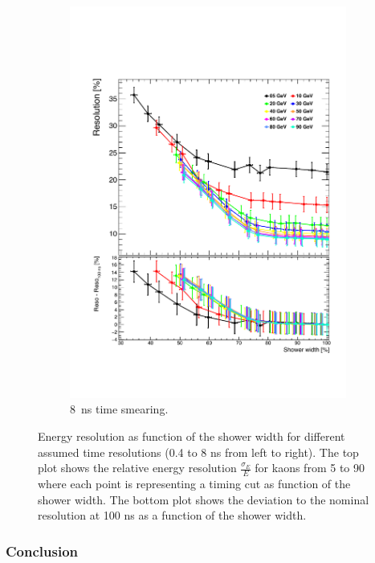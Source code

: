 \begin{figure}[htbp!]
\begin{subfigure}[t]{0.5\textwidth}
    \includegraphics[width=1\linewidth]{chap6/fig_TimingILD/8ns_Smearing/ShowerWidth_Resolution_Smearing8ns}
    \vspace{-6ex}
    \caption{\SI{8}{\nano\second} time smearing.}  \label{fig:WidthReso8ns}
  \end{subfigure}
  \caption{Energy resolution as function of the shower width for different assumed time resolutions (0.4 to 8 ns from left to right). The top plot shows the relative energy resolution $\frac{\sigma_{E}}{E}$ for kaons from 5 to 90 \GeV where each point is representing a timing cut as function of the shower width. The bottom plot shows the deviation to the nominal resolution at 100 ns as a function of the shower width.}
\end{figure}

\subsubsection{Conclusion}

